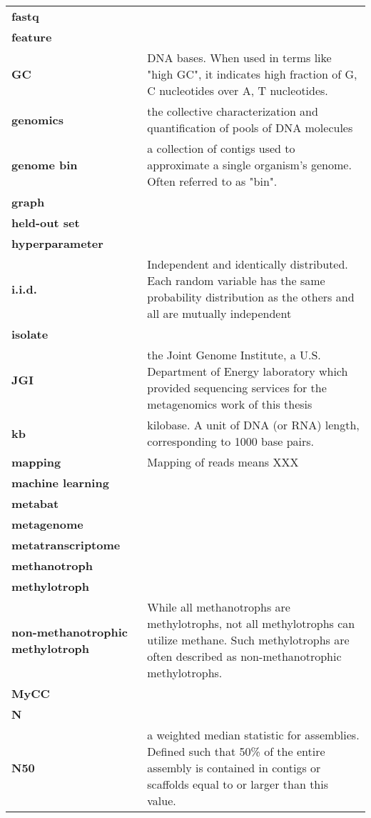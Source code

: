 \begin{singlespace}
\begin{longtable}{ p{}  p{} }
\textbf{fastq} &  \\
\textbf{feature} &  \\
\textbf{GC} & DNA bases.  When used in terms like "high GC", it indicates high fraction of G, C nucleotides over A, T nucleotides. \\
\textbf{genomics} & the collective characterization and quantification of pools of DNA molecules \\
\textbf{genome bin} & a collection of contigs used to approximate a single organism's genome.  Often referred to as "bin". \\
\textbf{graph} &  \\
\textbf{held-out set} &  \\
\textbf{hyperparameter} &  \\
\textbf{i.i.d.} & Independent and identically distributed.
    Each random variable has the same probability distribution as the others and all are mutually independent \\
\textbf{isolate} & \\
\textbf{JGI} & the Joint Genome Institute, a U.S. Department of Energy laboratory which provided sequencing
                services for the metagenomics work of this thesis \\
\textbf{kb} & kilobase. A unit of DNA (or RNA) length, corresponding to 1000 base pairs. \\
\textbf{mapping} & Mapping of reads means XXX \\
\textbf{machine learning} &  \\
\textbf{metabat} &  \\
\textbf{metagenome} &  \\
\textbf{metatranscriptome} &  \\
\textbf{methanotroph} &  \\
\textbf{methylotroph} &  \\
\textbf{non-methanotrophic methylotroph} & While all methanotrophs are methylotrophs, not all methylotrophs can utilize methane.
	Such methylotrophs are often described as non-methanotrophic methylotrophs. \\
\textbf{MyCC} &  \\
\textbf{N} &  \\
\textbf{N50} & a weighted median statistic for assemblies.  %
    Defined such that 50\% of the entire assembly is contained in contigs or scaffolds equal to or larger than this value. \\

\end{longtable}
\end{singlespace}
